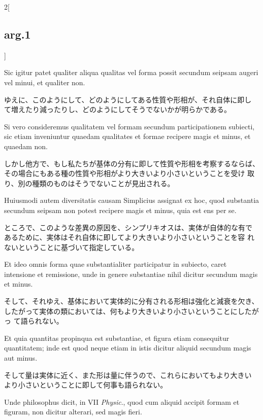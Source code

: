 \documentclass[paper=a4paper,fontsize=10pt,jafontsize=9pt,titlepage]{jlreq}
\begin{document}
\begin{paracol}{2}[\subsection{arg.1}]
\switchcolumn*

Sic igitur patet qualiter
aliqua qualitas vel forma possit secundum seipsam augeri vel minui, et
qualiter non.

\switchcolumn

ゆえに、このようにして、どのようにしてある性質や形相が、それ自体に即し
 て増えたり減ったりし、どのようにしてそうでないかが明らかである。

\switchcolumn*

Si vero consideremus qualitatem vel formam secundum
participationem subiecti, sic etiam inveniuntur quaedam qualitates et
formae recipere magis et minus, et quaedam non.

\switchcolumn

しかし他方で、もし私たちが基体の分有に即して性質や形相を考察するならば、
 その場合にもある種の性質や形相がより大きいより小さいということを受け
 取り、別の種類のものはそうでないことが見出される。

\switchcolumn*

Huiusmodi autem
diversitatis causam Simplicius assignat ex hoc, quod substantia
secundum seipsam non potest recipere magis et minus, quia est ens per
se.

\switchcolumn

ところで、このような差異の原因を、シンプリキオスは、実体が自体的な有で
 あるために、実体はそれ自体に即してより大きいより小さいということを容
 れないということに基づいて指定している。

\switchcolumn*

Et ideo omnis forma quae substantialiter participatur in subiecto,
caret intensione et remissione, unde in genere substantiae nihil
dicitur secundum magis et minus.

\switchcolumn

そして、それゆえ、基体において実体的に分有される形相は強化と減衰を欠き、
 したがって実体の類においては、何もより大きいより小さいということにしたがっ
 て語られない。

\switchcolumn*

Et quia quantitas propinqua est
substantiae, et figura etiam consequitur quantitatem; inde est quod
neque etiam in istis dicitur aliquid secundum magis aut minus.

\switchcolumn

そして量は実体に近く、また形は量に伴うので、これらにおいてもより大きい
 より小さいということに即して何事も語られない。

\switchcolumn*

Unde
philosophus dicit, in VII {\itshape Physic}., quod cum aliquid accipit formam et
figuram, non dicitur alterari, sed magis fieri.


\end{paracol}
\end{document}
